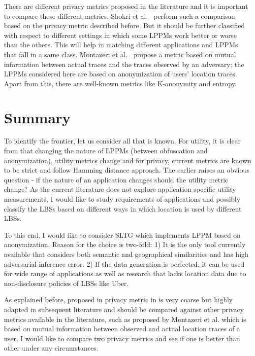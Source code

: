 \documentclass[USenglish,oneside,twocolumn]{article}
\begin{document}
There are different privacy metrics proposed in the literature and it is important to compare these different metrics. Shokri et al.~\cite{qlp} perform such a comparison based on the privacy metric described before. But it should be further classified with respect to different settings in which some LPPMs work better or worse than the others. This will help in matching different applications and LPPMs that fall in a same class. Montazeri et al.~\cite{zarrin} propose a metric based on mutual information between actual traces and the traces observed by an adversary; the LPPMs considered here are based on anonymization of users' location traces. Apart from this, there are well-known metrics like K-anonymity and entropy.

\section{Summary}
To identify the frontier, let us consider all that is known. For utility, it is clear from \cite{util-imp,vincent} that changing the nature of LPPMs (between obfuscation and anonymization), utility metrics change and for privacy, current metrics are known to be strict and follow Hamming distance approach. The earlier raises an obvious question - if the nature of an application changes should the utility metric change? As the current literature does not explore application specific utility measurements, I would like to study requirements of applications and possibly classify the LBSs based on different ways in which location is used by different LBSs. 

To this end, I would like to consider SLTG which implements LPPM based on anonymization. Reason for the choice is two-fold: 1) It is the only tool currently available that considers both semantic and geographical similarities and has high adversarial inference error. 2) If the data generation is perfected, it can be used for wide range of applications as well as research that lacks location data due to non-disclosure policies of LBSs like Uber.

As explained before, proposed in privacy metric in \cite{qlp} is very coarse but highly adapted in subsequent literature and should be compared against other privacy metrics available in the literature, such as proposed by Montazeri et al.\cite{zarrin} which is based on mutual information between observed and actual location traces of a user. I would like to compare two privacy metrics and see if one is better than other under any circumstances. 
\end{document}
